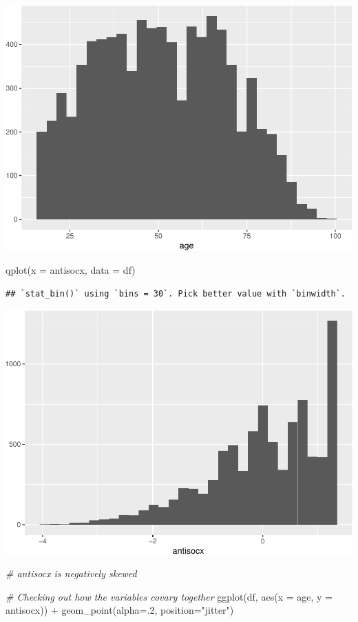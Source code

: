 \documentclass[
]{book}
\newenvironment{Shaded}{\begin{snugshade}}{\end{snugshade}}
\newcommand{\AttributeTok}[1]{\textcolor[rgb]{0.77,0.63,0.00}{#1}}
\newcommand{\CommentTok}[1]{\textcolor[rgb]{0.56,0.35,0.01}{\textit{#1}}}
\newcommand{\DecValTok}[1]{\textcolor[rgb]{0.00,0.00,0.81}{#1}}
\newcommand{\FunctionTok}[1]{\textcolor[rgb]{0.00,0.00,0.00}{#1}}
\newcommand{\NormalTok}[1]{#1}
\newcommand{\SpecialCharTok}[1]{\textcolor[rgb]{0.00,0.00,0.00}{#1}}
\newcommand{\StringTok}[1]{\textcolor[rgb]{0.31,0.60,0.02}{#1}}
\begin{document}
\includegraphics{09-regression_files/figure-latex/unnamed-chunk-6-1.pdf}

\begin{Shaded}
\begin{Highlighting}[]
\FunctionTok{qplot}\NormalTok{(}\AttributeTok{x =}\NormalTok{ antisocx, }\AttributeTok{data =}\NormalTok{ df)}
\end{Highlighting}
\end{Shaded}

\begin{verbatim}
## `stat_bin()` using `bins = 30`. Pick better value with `binwidth`.
\end{verbatim}

\includegraphics{09-regression_files/figure-latex/unnamed-chunk-6-2.pdf}

\begin{Shaded}
\begin{Highlighting}[]
\CommentTok{\# antisocx is negatively skewed}

\CommentTok{\# Checking out how the variables covary together}
\FunctionTok{ggplot}\NormalTok{(df, }\FunctionTok{aes}\NormalTok{(}\AttributeTok{x =}\NormalTok{ age, }\AttributeTok{y =}\NormalTok{ antisocx)) }\SpecialCharTok{+} 
  \FunctionTok{geom\_point}\NormalTok{(}\AttributeTok{alpha=}\NormalTok{.}\DecValTok{2}\NormalTok{, }\AttributeTok{position=}\StringTok{"jitter"}\NormalTok{)}
\end{Highlighting}
\end{Shaded}
\end{document}
